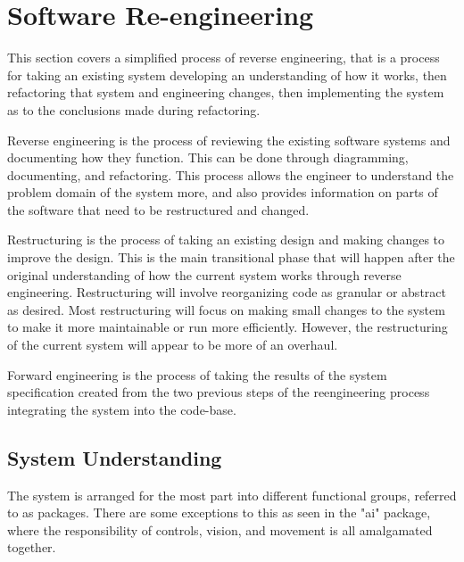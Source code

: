 
\chapter{Software Re-engineering} %

\label{Chapter3} %

This section covers a simplified process of reverse engineering, that is a process for taking an existing system developing an understanding of how it works, then refactoring that system and engineering changes, then implementing the system as to the conclusions made during refactoring.

Reverse engineering is the process of reviewing the existing software systems and documenting how they function. This can be done through diagramming, documenting, and refactoring. This process allows the engineer to understand the problem domain of the system more, and also provides information on parts of the software that need to be restructured and changed.

Restructuring is the process of taking an existing design and making changes to improve the design. This is the main transitional phase that will happen after the original understanding of how the current system works through reverse engineering. Restructuring will involve reorganizing code as granular or abstract as desired. Most restructuring will focus on making small changes to the system to make it more maintainable or run more efficiently. However, the restructuring of the current system will appear to be more of an overhaul.

Forward engineering is the process of taking the results of the system specification created from the two previous steps of the reengineering process integrating the system into the code-base.


\section{System Understanding}

The system is arranged for the most part into different functional groups, referred to as packages. There are some exceptions to this as seen in the "ai" package, where the responsibility of controls, vision, and movement is all amalgamated together.

